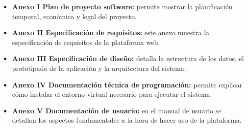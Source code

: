 \begin{itemize}
	\item \textbf{Anexo I Plan de proyecto software:} permite mostrar la planificación temporal, económica y legal del proyecto.
	\item \textbf{Anexo II Especificación de requisitos:} este anexo muestra la especificación de requisitos de la plataforma web.
	\item \textbf{Anexo III Especificación de diseño:} detalla la estructura de los datos, el prototipado de la aplicación y la arquitectura del sistema.
	\item \textbf{Anexo IV Documentación técnica de programación:} permite explicar cómo instalar el entorno virtual necesario para ejecutar el sistema.
	\item \textbf{Anexo V Documentación de usuario:} en el manual de usuario se detallan los aspectos fundamentales a la hora de hacer uso de la plataforma.
	
\end{itemize}